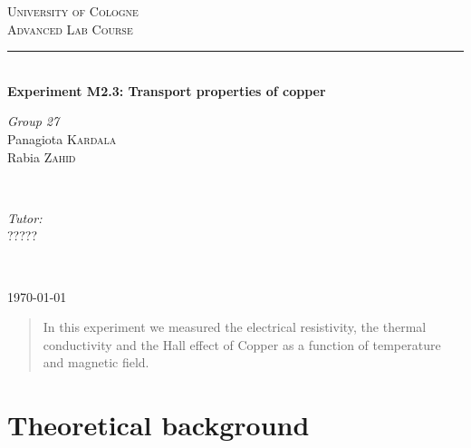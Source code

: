 \documentclass[openany,11pt,a4paper]{report}
\begin{document}
\pagestyle{empty}


\begin{titlepage}

\newcommand{\HRule}{\rule{\linewidth}{0.5mm}} 
\center 

\textsc{\LARGE University of Cologne}\\[1.5cm]
\textsc{\Large Advanced Lab Course}\\[0.5cm] 

\vfill


\HRule \\[0.4cm]
{\huge \textbf {Experiment M2.3:
Transport properties of copper}}

 
\vfill

\begin{minipage}{0.4\textwidth}
\begin{flushleft} \large
\emph{Group 27}\\
Panagiota \textsc{Kardala}\\
Rabia \textsc{Zahid}
 
\end{flushleft}
\end{minipage}
~
\begin{minipage}{0.4\textwidth}
\begin{flushright} \large
\emph{Tutor:} \\
{????? } 
\end{flushright}
\end{minipage}\\[4cm]


\vfill

{\large \today}\\[3cm] 

\vfill

\end{titlepage}



\pagestyle{plain}

\tableofcontents







\begin{abstract}
In this experiment we measured the electrical resistivity, the thermal conductivity and the Hall effect of Copper as a function of temperature and magnetic field.
\end{abstract}


\chapter{Theoretical background}
\end{document}
